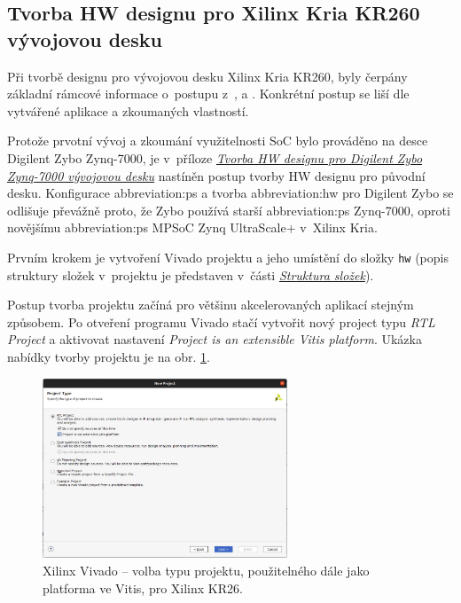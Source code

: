 \documentclass[a4paper, twoside, 11pt]{article}
\begin{document}
		
		\subsection{Tvorba HW designu pro Xilinx Kria KR260 vývojovou desku}\label{subsec:tvorba-hw-designu-pro-xilinx-kria-kr260-vyvojovou-desku}
				Při tvorbě designu pro vývojovou desku Xilinx Kria KR260, byly čerpány základní rámcové informace o~postupu z~\cite{hackster-getting-started-with-the-kria-kr260-in-petalinux}, \cite{hackster-add-peripherial-support-to-kria-kr260-vivado} a \cite{hackster-getting-started-with-the-kria-kr260-in-vivado}. Konkrétní postup se liší dle vytvářené aplikace a zkoumaných vlastností.\par
				Protože prvotní vývoj a zkoumání využitelnosti SoC bylo prováděno na desce Digilent Zybo Zynq-7000, je v~příloze \hyperref[sec:appendicies:-tvorba-hw-designu-pro-digilent-zybo-zynq-7000-vyvojovou-desku]{\textit{Tvorba HW designu pro Digilent Zybo Zynq-7000
				vývojovou desku}} nastíněn postup tvorby HW designu pro původní desku. Konfigurace \gls{abbreviation:ps} a tvorba \gls{abbreviation:hw} pro Digilent Zybo se odlišuje převážně proto, že Zybo používá starší \gls{abbreviation:ps} Zynq-7000, oproti novějšímu \gls{abbreviation:ps} MPSoC Zynq UltraScale+ v~Xilinx Kria.\par
				Prvním krokem je vytvoření Vivado projektu a jeho umístění do složky \texttt{hw} (popis struktury složek v~projektu je představen v~části \hyperref[sec:struktura-slozek]{\textit{Struktura složek}}).\par
				Postup tvorba projektu začíná pro většinu akcelerovaných aplikací stejným způsobem. Po otveření programu Vivado stačí vytvořit nový project typu \textit{RTL Project} a aktivovat nastavení \textit{Project is an extensible Vitis platform}. Ukázka nabídky tvorby projektu je na obr. \ref{fig:kr26-xilix-vivado-flow-01}.


				\begin{figure}[htbp!]
					\centering
					\includegraphics[width=0.65\textwidth]{src/png/kr26-xilinx-vivado-flow/kr26-xilix-vivado-flow-01.jpg}
					\caption{Xilinx Vivado – volba typu projektu, použitelného dále jako platforma ve Vitis, pro Xilinx KR26.}
					\label{fig:kr26-xilix-vivado-flow-01}
				\end{figure}
\end{document}
